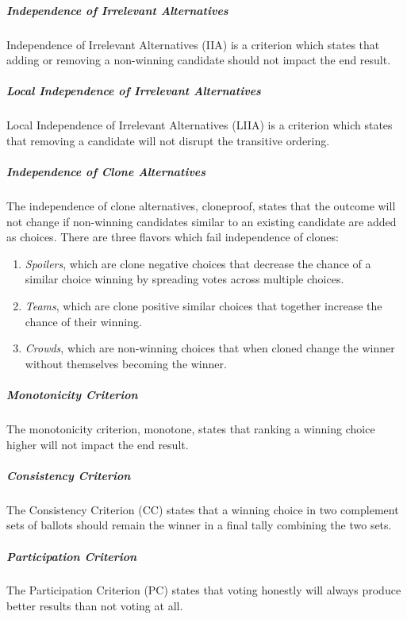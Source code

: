 
\subparagraph{Independence of Irrelevant Alternatives}
Independence of Irrelevant Alternatives (IIA) is a criterion which states that
adding or removing a non-winning candidate should not impact the end result.

\subparagraph{Local Independence of Irrelevant Alternatives}
Local Independence of Irrelevant Alternatives (LIIA) is a criterion which states
that removing a candidate will not disrupt the transitive ordering.

\subparagraph{Independence of Clone Alternatives}
The independence of clone alternatives, cloneproof, states that the outcome will
not change if non-winning candidates similar to an existing candidate are added
as choices. There are three flavors which fail independence of clones:
\begin{enumerate}
    \item \emph{Spoilers}, which are clone negative choices that decrease the
      chance of a similar choice winning by spreading votes across multiple
      choices.
    \item \emph{Teams}, which are clone positive similar choices that together
        increase the chance of their winning.
    \item \emph{Crowds}, which are non-winning choices that when cloned change
        the winner without themselves becoming the winner.
\end{enumerate}

\subparagraph{Monotonicity Criterion}
The monotonicity criterion, monotone, states that ranking a winning choice
higher will not impact the end result.

\subparagraph{Consistency Criterion}
The Consistency Criterion (CC) states that a winning choice in two complement
sets of ballots should remain the winner in a final tally combining the two
sets.

\subparagraph{Participation Criterion}
The Participation Criterion (PC) states that voting honestly will always produce
better results than not voting at all.

